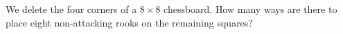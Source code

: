 We delete the four corners of a $8 \times 8$ chessboard. How many ways are there to place eight non-attacking rooks on the remaining squares?
